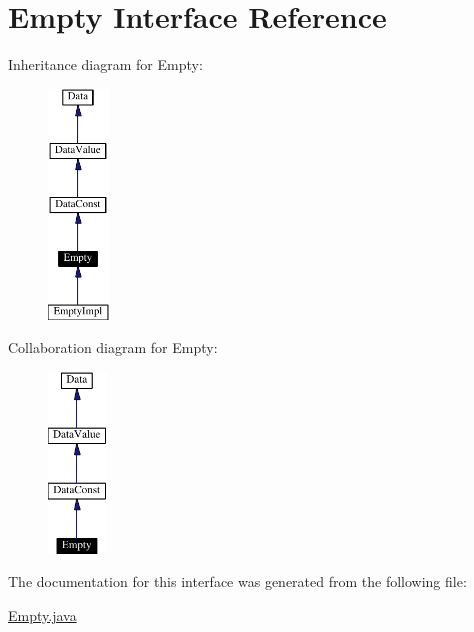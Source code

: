 \hypertarget{interfaceEmpty}{
\section{Empty  Interface Reference}
\label{interfaceEmpty}
}
Inheritance diagram for Empty:\begin{figure}[H]
\begin{center}
\leavevmode
\includegraphics[width=46pt]{interfaceEmpty__inherit__graph}
\end{center}
\end{figure}
Collaboration diagram for Empty:\begin{figure}[H]
\begin{center}
\leavevmode
\includegraphics[width=44pt]{interfaceEmpty__coll__graph}
\end{center}
\end{figure}


The documentation for this interface was generated from the following file:\begin{CompactItemize}
\item 
\hyperlink{Empty_8java-source}{Empty.java}\end{CompactItemize}
